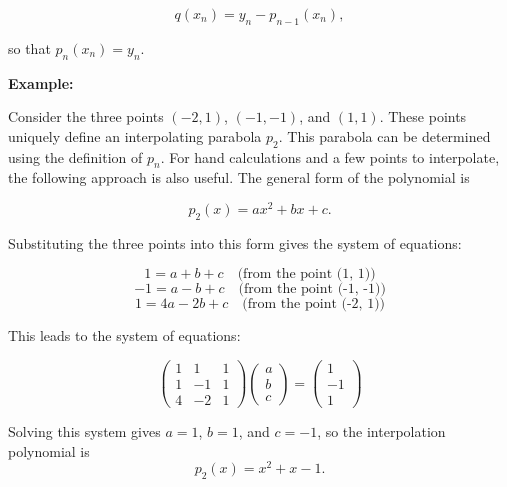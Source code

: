 \[
	q(x_n) = y_n - p_{n-1}(x_n),
\]

so that \(p_n(x_n) = y_n\). 

\QED
\vspace{\baselineskip}

\textbf{Example:}
\vspace{\baselineskip}

Consider the three points \((-2, 1)\), \((-1, -1)\), and \((1, 1)\). 
These points uniquely define an interpolating parabola \(p_2\). This parabola can be 
determined using the definition of \(p_n\). 
For hand calculations and a few 
points to interpolate, the following approach is also useful. The general form of the polynomial is 

\[
	p_2(x) = ax^2 + bx + c.
\]

Substituting the three points into this form gives the system of equations:

\[
	1 = a + b + c \quad \text{(from the point (1, 1))}
\]
\[
	-1 = a - b + c \quad \text{(from the point (-1, -1))}
\]
\[
	1 = 4a - 2b + c \quad \text{(from the point (-2, 1))}
\]

This leads to the system of equations:

\[
	\begin{pmatrix}
	1 & 1 & 1 \\
	1 & -1 & 1 \\
	4 & -2 & 1
	\end{pmatrix}
	\begin{pmatrix}
	a \\
	b \\
	c
	\end{pmatrix}
	=
	\begin{pmatrix}
	1 \\
	-1 \\
	1
	\end{pmatrix}
\]

Solving this system gives \(a = 1\), \(b = 1\), and \(c = -1\), so the interpolation polynomial is
\[
	p_2(x) = x^2 + x - 1.
\]



